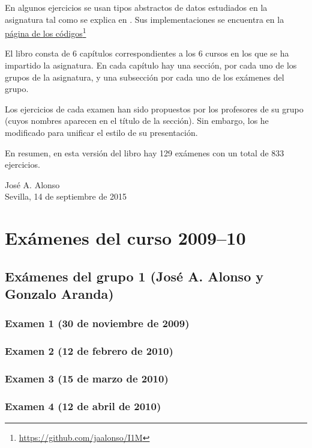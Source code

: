 \documentclass[a4paper,12pt,twoside]{book}
\begin{document}
En algunos ejercicios se usan tipos abstractos de datos estudiados en la
asignatura tal como se explica en \cite{Alonso-12a}. Sus implementaciones se
encuentra en la
\href{https://github.com/jaalonso/I1M}
     {página de los códigos}\footnote{\url{https://github.com/jaalonso/I1M}}

El libro consta de 6 capítulos correspondientes a los 6 cursos en los que
se ha impartido la asignatura. En cada capítulo hay una sección, por
cada uno de los grupos de la asignatura, y una subsección por cada uno de los
exámenes del grupo.  

Los ejercicios de cada examen han sido propuestos por los profesores de su
grupo (cuyos nombres aparecen en el título de la sección). Sin embargo, los he
modificado para unificar el estilo de su presentación.

En resumen, en esta versión del libro hay 129 exámenes con un total de 833 
ejercicios.

\begin{flushright}
  José A. Alonso \\
  Sevilla, 14 de septiembre de 2015
\end{flushright}

\chapter{Exámenes del curso 2009--10}

\section{Exámenes del grupo 1 (José A. Alonso y Gonzalo Aranda)}
\subsection{Examen 1 (30 de noviembre de 2009)}
\subsection{Examen 2 (12 de febrero de 2010)}
\subsection{Examen 3 (15 de marzo de 2010)}
\subsection{Examen 4 (12 de abril de 2010)} 
\end{document}

